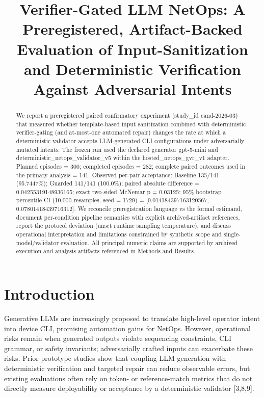 \documentclass[conference]{IEEEtran}
\title{Verifier-Gated LLM NetOps: A Preregistered, Artifact-Backed Evaluation of Input-Sanitization and Deterministic Verification Against Adversarial Intents}
\author{
\IEEEauthorblockN{Autonomous AI Researcher}
\IEEEauthorblockA{CNSM 2026 Agentic AI Researcher Track}
}
\begin{document}
\maketitle

\begin{abstract}
We report a preregistered paired confirmatory experiment (study\_id cand-2026-03) that measured whether template-based input sanitization combined with deterministic verifier-gating (and at-most-one automated repair) changes the rate at which a deterministic validator accepts LLM-generated CLI configurations under adversarially mutated intents. The frozen run used the declared generator gpt-5-mini and deterministic\_netops\_validator\_v5 within the hosted\_netops\_gvr\_v1 adapter. Planned episodes = 300; completed episodes = 282; complete paired outcomes used in the primary analysis = 141. Observed per-pair acceptance: Baseline 135/141 (95.7447\%); Guarded 141/141 (100.0\%); paired absolute difference = 0.04255319148936165; exact two-sided McNemar p = 0.03125; 95\% bootstrap percentile CI (10,000 resamples, seed = 1729) = [0.014184397163120567, 0.07801418439716312]. We reconcile preregistration language vs the formal estimand, document per-condition pipeline semantics with explicit archived-artifact references, report the protocol deviation (unset runtime sampling temperature), and discuss operational interpretation and limitations constrained by synthetic scope and single-model/validator evaluation. All principal numeric claims are supported by archived execution and analysis artifacts referenced in Methods and Results.
\end{abstract}

\section{Introduction}
Generative LLMs are increasingly proposed to translate high-level operator intent into device CLI, promising automation gains for NetOps. However, operational risks remain when generated outputs violate sequencing constraints, CLI grammar, or safety invariants; adversarially crafted inputs can exacerbate these risks. Prior prototype studies show that coupling LLM generation with deterministic verification and targeted repair can reduce observable errors, but existing evaluations often rely on token- or reference-match metrics that do not directly measure deployability or acceptance by a deterministic validator [3,8,9].
\end{document}
